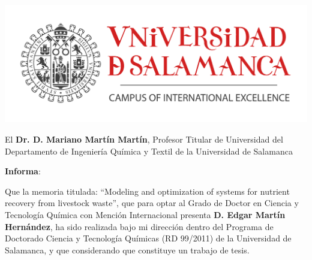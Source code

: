 


\includegraphics[scale=0.22]{gfx/Logo_Usal_Hor_Eng_2012}%


\bigskip

El \textbf{Dr. D. Mariano Martín Martín}, Profesor Titular de Universidad del Departamento de Ingeniería
Química y Textil de la Universidad de Salamanca

\bigskip
\textbf{Informa}: 
\bigskip

Que  la  memoria  titulada: ``Modeling and optimization of systems for nutrient recovery from livestock waste'', que para optar al Grado de Doctor en Ciencia y Tecnología Química 
con Mención Internacional presenta  \textbf{D. Edgar Martín Hernández}, ha sido realizada bajo mi dirección dentro del Programa de Doctorado Ciencia y Tecnología 
Químicas (RD  99/2011) de la Universidad de Salamanca, y que considerando que constituye un trabajo de tesis.

